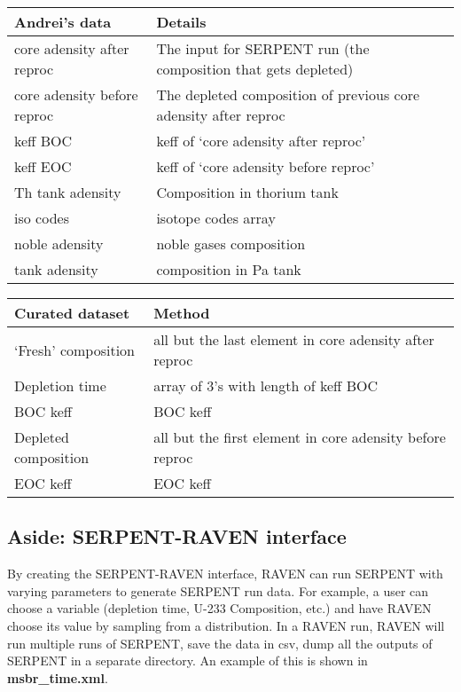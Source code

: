 \documentclass{article}
\begin{document}
\begin{table}
\begin{center}
\begin{tabular}{ l l }
    \hline
    Andrei's data & Details \\
    \hline
    core adensity after reproc & The input for SERPENT run (the composition that gets depleted) \\ 
    core adensity before reproc & The depleted composition of previous core adensity after reproc \\
    keff BOC & keff of `core adensity after reproc' \\
    keff EOC & keff of `core adensity before reproc' \\
    Th tank adensity & Composition in thorium tank \\
    iso codes & isotope codes array \\
    noble adensity & noble gases composition \\
    tank adensity & composition in Pa tank \\
    \hline
\end{tabular}
\end{center}
\label{tab:andrei}
\end{table}

\begin{table}
\begin{center}
\begin{tabular}{ l l }
    \hline
    Curated dataset & Method \\
    \hline
    `Fresh' composition & all but the last element in core adensity after reproc  \\
    Depletion time & array of 3's with length of keff BOC \\
    BOC keff & BOC keff \\
    Depleted composition & all but the first element in core adensity before reproc \\  
    EOC keff & EOC keff \\
    \hline
\end{tabular}
\label{tab:csv}
\end{center}
\end{table}


\subsection*{Aside: SERPENT-RAVEN interface}

By creating the SERPENT-RAVEN interface, RAVEN can run SERPENT
with varying parameters to generate SERPENT run data. For example,
a user can choose a variable (depletion time, U-233 Composition, etc.)
and have RAVEN choose its value by sampling from a distribution. 
In a RAVEN run, RAVEN will run multiple runs of SERPENT, save the 
data in csv, dump all the outputs of SERPENT in a separate directory.
An example of this is shown in \textbf{msbr\_time.xml}.
\end{document}
